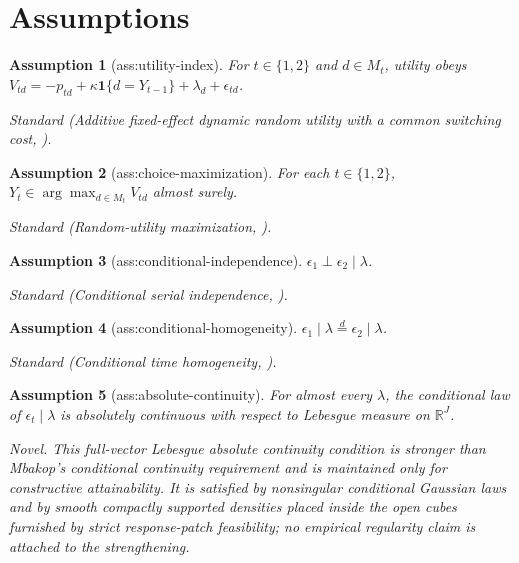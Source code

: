 \documentclass{article}
\newtheorem{assumption}{Assumption}
\begin{document}
\section{Assumptions}

\begin{assumption}[ass:utility-index]\label{ass:utility-index}
For \(t\in\{1,2\}\) and \(d\in M_t\), utility obeys \(V_{td}=-p_{td}+\kappa\mathbf 1\{d=Y_{t-1}\}+\lambda_d+\epsilon_{td}\).
\par\smallskip\noindent\emph{Standard} (Additive fixed-effect dynamic random utility with a common switching cost, \cite{PakesPorterShepardCalderWang2025}).
\end{assumption}

\begin{assumption}[ass:choice-maximization]\label{ass:choice-maximization}
For each \(t\in\{1,2\}\), \(Y_t\in\arg\max_{d\in M_t}V_{td}\) almost surely.
\par\smallskip\noindent\emph{Standard} (Random-utility maximization, \cite{KitamuraStoye2018}).
\end{assumption}

\begin{assumption}[ass:conditional-independence]\label{ass:conditional-independence}
\(\epsilon_1\perp\epsilon_2\mid\lambda\).
\par\smallskip\noindent\emph{Standard} (Conditional serial independence, \cite{PakesPorterShepardCalderWang2025}).
\end{assumption}

\begin{assumption}[ass:conditional-homogeneity]\label{ass:conditional-homogeneity}
\(\epsilon_1\mid\lambda\overset{d}=\epsilon_2\mid\lambda\).
\par\smallskip\noindent\emph{Standard} (Conditional time homogeneity, \cite{PakesPorterShepardCalderWang2025}).
\end{assumption}

\begin{assumption}[ass:absolute-continuity]\label{ass:absolute-continuity}
For almost every \(\lambda\), the conditional law of \(\epsilon_t\mid\lambda\) is absolutely continuous with respect to Lebesgue measure on \(\mathbb R^J\).
\par\smallskip\noindent\emph{Novel.} This full-vector Lebesgue absolute continuity condition is stronger than Mbakop's conditional continuity requirement and is maintained only for constructive attainability. It is satisfied by nonsingular conditional Gaussian laws and by smooth compactly supported densities placed inside the open cubes furnished by strict response-patch feasibility; no empirical regularity claim is attached to the strengthening.
\end{assumption}
\end{document}

